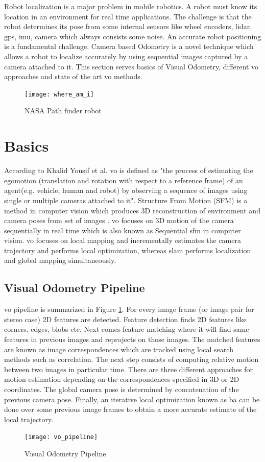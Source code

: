 Robot localization is a major problem in mobile robotics. A robot must know its location in an environment for real time applications. The challenge is that the robot determines its pose from some internal sensors like wheel encoders, \acrshort{lidar}, \acrshort{gps}, \acrshort{imu}, camera which always consists some noise. An accurate robot positioning is a fundamental challenge. Camera based Odometry is a novel technique which allows a robot to localize accurately by using sequential images captured by a camera attached to it. This section serves basics of Visual Odometry, different \acrshort{vo} approaches and state of the art \acrshort{vo} methods.\\
\begin{figure}[h]
	\centering
	\texttt{[image: where\_am\_i]}
	\caption{NASA Path finder robot\cite{nasa}}
\end{figure}
\section{Basics}
According to Khalid Yousif et al.\cite{KhalidYousif-et-al-2015} \acrshort{vo} is defined as "the process of estimating the egomotion (translation and rotation with respect to a reference frame) of an agent(e.g. vehicle, human and robot) by observing a sequence of images using single or multiple cameras attached to it". Structure From Motion (SFM) is a method in computer vision which produces 3D reconstruction of environment and camera poses from set of images \cite{ScaramuzzaVO}. \acrshort{vo} focuses on 3D motion of the camera sequentially in real time which is also known as Sequential \acrshort{sfm} in computer vision. \acrshort{vo} focuses on local mapping and incrementally estimates the camera trajectory and performs local optimization, whereas \acrshort{slam} performs localization and global mapping simultaneously.

\subsection{Visual Odometry Pipeline}
\acrshort{vo} pipeline is summarized in Figure \ref{fig:flow}. For every image frame (or image pair for stereo case) 2D features are detected. Feature detection finds 2D features like corners, edges, blobs etc. Next comes feature matching where it will find same features in previous images and reprojects on those images. The matched features are known as image correspondences which are tracked using local search methods such as correlation. The next step consists of computing relative motion between two images in particular time. There are three different approaches for motion estimation depending on the correspondences specified in 3D or 2D coordinates. The global camera pose is determined by concatenation of the previous camera pose. Finally, an iterative local optimization known as \acrshort{ba} can be done over some previous image frames to obtain a more accurate estimate of the local trajectory.
\begin{figure}[h]
	\centering
	\texttt{[image: vo\_pipeline]}
	\caption{Visual Odometry Pipeline}
	\label{fig:flow}
\end{figure}
